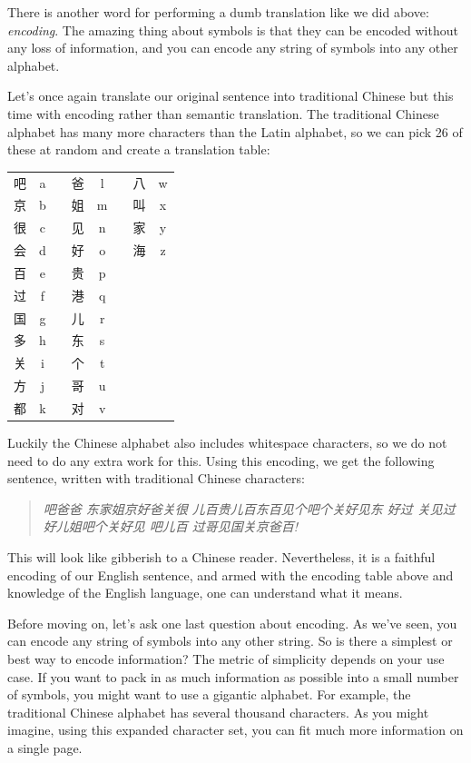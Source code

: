 \documentclass[UTF8]{book}
\begin{document}
\begin{CJK}{UTF8}{gbsn}
There is another word for performing a dumb translation like we did above: \emph{encoding}. The amazing thing about symbols is that they can be encoded without any loss of information, and you can encode any string of symbols into any other alphabet.

Let's once again translate our original sentence into traditional Chinese but this time with encoding rather than semantic translation. The traditional Chinese alphabet has many more characters than the Latin alphabet, so we can pick 26 of these at random and create a translation table:

\begin{center}
\begin{tabular}{ cccccccc }
 吧 & a & & 爸 & l & & 八 & w \\
 京 & b & & 姐 & m & & 叫 & x \\
 很 & c & & 见 & n & & 家 & y \\
 会 & d & & 好 & o & & 海 & z \\
 百 & e & & 贵 & p & & \\
 过 & f & & 港 & q & & \\
 国 & g & & 儿 & r & & \\
 多 & h & & 东 & s & & \\
 关 & i & & 个 & t & & \\
 方 & j & & 哥 & u & & \\
 都 & k & & 对 & v & & \\
\end{tabular}
\end{center}

Luckily the Chinese alphabet also includes whitespace characters, so we do not need to do any extra work for this. Using this encoding, we get the following sentence, written with traditional Chinese characters:

\begin{quotation}
\centering
\emph{吧爸爸 东家姐京好爸关很 儿百贵儿百东百见个吧个关好见东 好过 关见过好儿姐吧个关好见 吧儿百 过哥见国关京爸百!}
\end{quotation}

This will look like gibberish to a Chinese reader. Nevertheless, it is a faithful encoding of our English sentence, and armed with the encoding table above and knowledge of the English language, one can understand what it means.

Before moving on, let's ask one last question about encoding. As we've seen, you can encode any string of symbols into any other string. So is there a simplest or best way to encode information? The metric of simplicity depends on your use case. If you want to pack in as much information as possible into a small number of symbols, you might want to use a gigantic alphabet. For example, the traditional Chinese alphabet has several thousand characters. As you might imagine, using this expanded character set, you can fit much more information on a single page.


\end{CJK}
\end{document}
